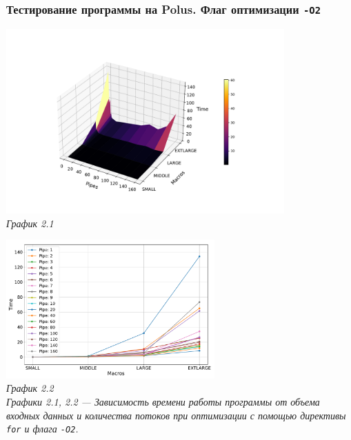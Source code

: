 \documentclass[a4paper, 11pt]{article}
\begin{document}
\subsubsection*{Тестирование программы на Polus. Флаг оптимизации \texttt{-O2}}
\begin{center}
    \includegraphics[width=0.8\textwidth]{../graph/for_o2.pdf} \\
    \small \it
    График 2.1
\end{center}

\begin{center}
    \includegraphics[width=0.6\textwidth]{../graph/for_o21.pdf} \\
    \small \it
    График 2.2\\ Графики 2.1, 2.2 --- Зависимость времени работы программы от объема входных данных и количества потоков при оптимизации с помощью директивы \texttt{for} и флага \texttt{-O2}.
\end{center}
\end{document}
